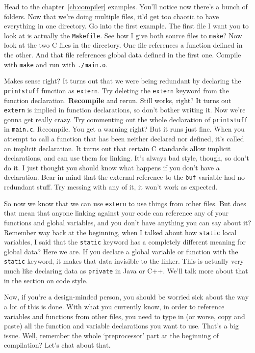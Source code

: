 \documentclass[ebook,11pt,oneside,openany]{memoir}
\newcommand{\cf}[1]{\texttt{#1}}
\begin{document}
Head to the chapter~\ref{ch:compiler} examples. You'll notice now there's a bunch of folders. Now that we're doing multiple files, it'd get too chaotic to have everything in one directory. Go into the first example. The first file I want you to look at is actually the \cf{Makefile}. See how I give both source files to \cf{make}? Now look at the two C files in the directory. One file references a function defined in the other. And that file references global data defined in the first one. Compile with \cf{make} and run with \cf{./main.o}.

Makes sense right? It turns out that we were being redundant by declaring the \cf{printstuff} function as \cf{extern}. Try deleting the \cf{extern} keyword from the function declaration. \textbf{Recompile} and rerun. Still works, right? It turns out \cf{extern} is implied in function declarations, so don't bother writing it. Now we're gonna get really crazy. Try commenting out the whole declaration of \cf{printstuff} in \cf{main.c}. Recompile. You get a warning right? But it runs just fine. When you attempt to call a function that has been neither declared nor defined, it's called an implicit declaration. It turns out that certain C standards allow implicit declarations, and can use them for linking. It's always bad style, though, so don't do it. I just thought you should know what happens if you don't have a declaration. Bear in mind that the external reference to the \cf{buf} variable had no redundant stuff. Try messing with any of it, it won't work as expected.

So now we know that we can use \cf{extern} to use things from other files. But does that mean that anyone linking against your code can reference any of your functions and global variables, and you don't have anything you can say about it? Remember way back at the beginning, when I talked about how \cf{static} local variables, I said that the \cf{static} keyword has a completely different meaning for global data? Here we are. If you declare a global variable or function with the \cf{static} keyword, it makes that data invisible to the linker. This is actually very much like declaring data as \cf{private} in Java or C++. We'll talk more about that in the section on code style.

Now, if you're a design-minded person, you should be worried sick about the way a lot of this is done. With what you currently know, in order to reference variables and functions from other files, you need to type in (or worse, copy and paste) all the function and variable declarations you want to use. That's a big issue. Well, remember the whole `preprocessor' part at the beginning of compilation? Let's chat about that.
\end{document}
